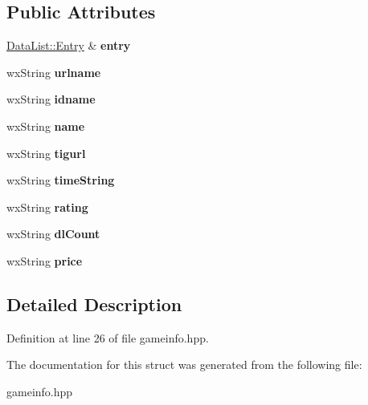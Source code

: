 \subsection*{Public Attributes}
\begin{DoxyCompactItemize}
\item 
\hypertarget{struct_game_info_aa207ee4bfcebec16fcef64c2b0f6bfca}{\hyperlink{struct_data_list_1_1_entry}{Data\-List\-::\-Entry} \& {\bfseries entry}}\label{struct_game_info_aa207ee4bfcebec16fcef64c2b0f6bfca}

\item 
\hypertarget{struct_game_info_aba474f531fb97a06211f05413f111e02}{wx\-String {\bfseries urlname}}\label{struct_game_info_aba474f531fb97a06211f05413f111e02}

\item 
\hypertarget{struct_game_info_af961f7540b9fb7ca93eff924ee573558}{wx\-String {\bfseries idname}}\label{struct_game_info_af961f7540b9fb7ca93eff924ee573558}

\item 
\hypertarget{struct_game_info_a633a412612e2144dfbfb370d18f97720}{wx\-String {\bfseries name}}\label{struct_game_info_a633a412612e2144dfbfb370d18f97720}

\item 
\hypertarget{struct_game_info_a907380dc6fd528c9806196780402423a}{wx\-String {\bfseries tigurl}}\label{struct_game_info_a907380dc6fd528c9806196780402423a}

\item 
\hypertarget{struct_game_info_a4ffd5954ea71f92ff977e368d251b87a}{wx\-String {\bfseries time\-String}}\label{struct_game_info_a4ffd5954ea71f92ff977e368d251b87a}

\item 
\hypertarget{struct_game_info_adde89478e87a5ce417a3f75aaf8c9381}{wx\-String {\bfseries rating}}\label{struct_game_info_adde89478e87a5ce417a3f75aaf8c9381}

\item 
\hypertarget{struct_game_info_a3b6fae2b20901fcf9ef266c584976503}{wx\-String {\bfseries dl\-Count}}\label{struct_game_info_a3b6fae2b20901fcf9ef266c584976503}

\item 
\hypertarget{struct_game_info_ab0605f63186107f4d96868775b5acf40}{wx\-String {\bfseries price}}\label{struct_game_info_ab0605f63186107f4d96868775b5acf40}

\end{DoxyCompactItemize}


\subsection{Detailed Description}


Definition at line 26 of file gameinfo.\-hpp.



The documentation for this struct was generated from the following file\-:\begin{DoxyCompactItemize}
\item 
gameinfo.\-hpp\end{DoxyCompactItemize}
